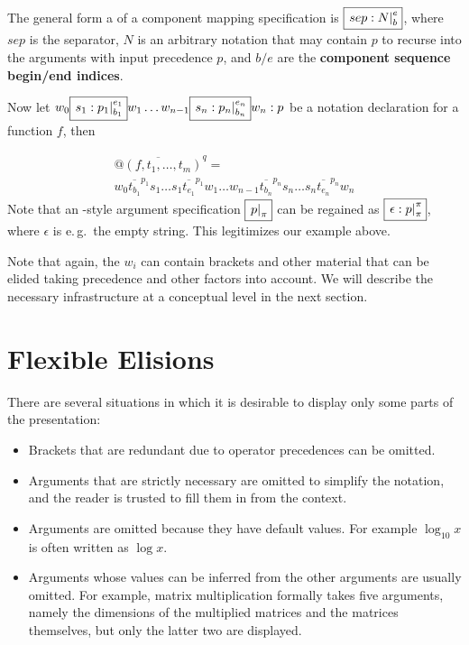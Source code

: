 \documentclass[a4paper]{article}
\def\pres#1#2{\overline{#1}^{#2}}
\def\defemph#1{{\bf{#1}}}
\def\imarg#1#2{\fbox{\ensuremath{\left.#1\right|_{#2}}}}
\def\fimarg#1#2#3{\fbox{\ensuremath{\left.#1\right|_{#2}^{#3}}}}
\def\recu#1{#1}%
\begin{document}
The general form a of a component mapping specification is $\fimarg{sep:N}be$, where $sep$
is the separator, $N$ is an arbitrary notation that may contain $\recu{p}$ to recurse into
the arguments with input precedence $p$, and $b/e$ are the {\defemph{component sequence
    begin/end indices}}.

Now let $w_0\fimarg{s_1:\recu{p_1}}{b_1}{e_1}w_1\ldots
w_{n-1}\fimarg{s_n:\recu{p_n}}{b_n}{e_n}w_n:p$ be a notation declaration for a function
$f$, then

\[
\begin{array}{l}\pres{@(f,t_1,\ldots,t_m)}{q}=\\
  w_0\pres{t_{b_1}}{p_1}s_1\ldots s_1\pres{t_{e_1}}{p_1}w_1\ldots
        w_{n-1}\pres{t_{b_n}}{p_n}s_n\ldots s_n\pres{t_{e_n}}{p_n}w_n
\end{array}
\]
Note that an {\isabelle}-style argument specification $\imarg{p}\pi$ can be regained as
  $\fimarg{\epsilon:\recu{p}}\pi\pi$, where $\epsilon$ is e.\,g.\  the empty
  string. This legitimizes our example above.

  Note that again, the $w_i$ can contain brackets and other material that can be elided
  taking precedence and other factors into account. We will describe the necessary
  infrastructure at a conceptual level in the next section. 

\section{Flexible Elisions}\label{sec:elision}

There are several situations in which it is desirable to display only some parts of the
presentation:
\begin{itemize}
\item Brackets that are redundant due to operator precedences can be omitted.
\item Arguments that are strictly necessary are omitted to simplify the notation, and the
  reader is trusted to fill them in from the context.
\item Arguments are omitted because they have default values. For example $\log_{10}x$ is
  often written as $\log x$.
\item Arguments whose values can be inferred from the other arguments are usually
  omitted. For example, matrix multiplication formally takes five arguments, namely the
  dimensions of the multiplied matrices and the matrices themselves, but only the latter
  two are displayed.
\end{itemize}
\end{document}
